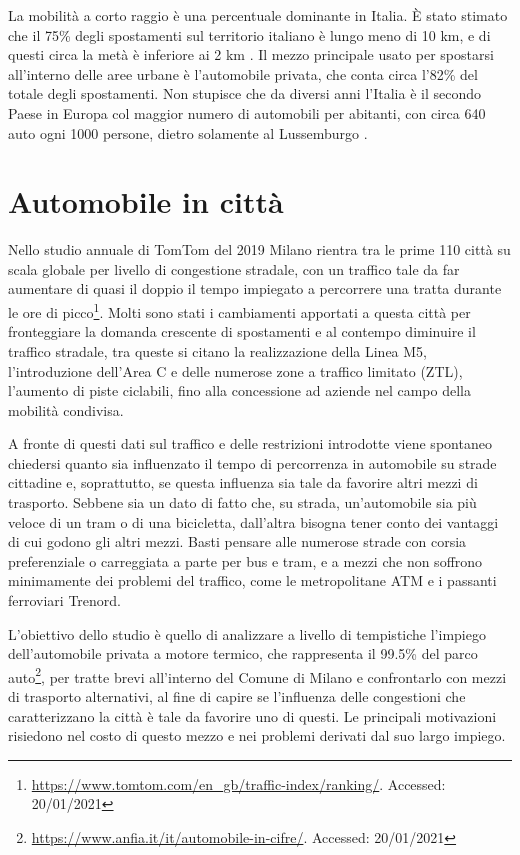 La mobilità a corto raggio è una percentuale dominante in Italia. È stato stimato che il 75\% degli spostamenti sul territorio italiano è lungo meno di 10 km, e di questi circa la metà è inferiore ai 2 km \cite{isfortaudimob}. Il mezzo principale usato per spostarsi all'interno delle aree urbane è l'automobile privata, che conta circa l'82\% del totale degli spostamenti. Non stupisce che da diversi anni l'Italia è il secondo Paese in Europa col maggior numero di automobili per abitanti, con circa 640 auto ogni 1000 persone, dietro solamente al Lussemburgo \cite{eurostatcars}.

\section{Automobile in città}

Nello studio annuale di TomTom del 2019 Milano rientra tra le prime 110 città su scala globale per livello di congestione stradale, con un traffico tale da far aumentare di quasi il doppio il tempo impiegato a percorrere una tratta durante le ore di picco\footnote{\url{https://www.tomtom.com/en_gb/traffic-index/ranking/}. Accessed: 20/01/2021}. Molti sono stati i cambiamenti apportati a questa città per fronteggiare la domanda crescente di spostamenti e al contempo diminuire il traffico stradale, tra queste si citano la realizzazione della Linea M5, l'introduzione dell'Area C e delle numerose zone a traffico limitato (ZTL), l'aumento di piste ciclabili, fino alla concessione ad aziende nel campo della mobilità condivisa.

A fronte di questi dati sul traffico e delle restrizioni introdotte viene spontaneo chiedersi quanto sia influenzato il tempo di percorrenza in automobile su strade cittadine e, soprattutto, se questa influenza sia tale da favorire altri mezzi di trasporto. Sebbene sia un dato di fatto che, su strada, un'automobile sia più veloce di un tram o di una bicicletta, dall'altra bisogna tener conto dei vantaggi di cui godono gli altri mezzi. Basti pensare alle numerose strade con corsia preferenziale o carreggiata a parte per bus e tram, e a mezzi che non soffrono minimamente dei problemi del traffico, come le metropolitane ATM e i passanti ferroviari Trenord.

L'obiettivo dello studio è quello di analizzare a livello di tempistiche l'impiego dell'automobile privata a motore termico, che rappresenta il 99.5\% del parco auto\footnote{\label{footanfia}\url{https://www.anfia.it/it/automobile-in-cifre/}. Accessed: 20/01/2021}, per tratte brevi all'interno del Comune di Milano e confrontarlo con mezzi di trasporto alternativi, al fine di capire se l'influenza delle congestioni che caratterizzano la città è tale da favorire uno di questi. Le principali motivazioni risiedono nel costo di questo mezzo e nei problemi derivati dal suo largo impiego.

